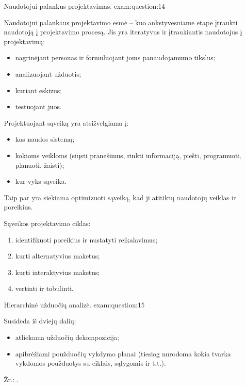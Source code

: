 \begin{question}{%
  Naudotojui palankus projektavimas.
  }{exam:question:14}
  
  Naudotojui palankaus projektavimo esmė – kuo ankstyvesniame etape
  įtraukti naudotoją į projektavimo procesą.\cite[165p.]{konspektas}
  Jis yra iteratyvus ir įtraukiantis naudotojus į projektavimą:
  \begin{itemize}
    \item nagrinėjant personas ir formuluojant joms panaudojamumo
      tikslus;
    \item analizuojant užduotis;
    \item kuriant eskizus;
    \item testuojant juos.
  \end{itemize}

  Projektuojant sąveiką yra atsižvelgiama į\cite[6]{skaidres-6}:
  \begin{itemize}
    \item kas naudos sistemą;
    \item kokioms veikloms (siųsti pranešimus, rinkti informaciją,
      piešti, programuoti, planuoti, žaisti);
    \item kur vyks sąveika.
  \end{itemize}
  Taip par yra siekiama optimizuoti sąveiką, kad ji atitiktų naudotojų
  veiklas ir poreikius.

  Sąveikos projektavimo ciklas\cite[10]{skaidres-6}:
  \begin{enumerate}
    \item identifikuoti poreikius ir nustatyti reikalavimus;
    \item kurti alternatyvius maketus;
    \item kurti interaktyvius maketus;
    \item vertinti ir tobulinti.
  \end{enumerate}

\end{question}

\begin{question}{%
  Hierarchinė užduočių analizė.
  }{exam:question:15}

  Susideda iš dviejų dalių:
  \begin{itemize}
    \item atliekama užduočių dekompozicija;
    \item apibrėžiami použduočių vykdymo planai (tiesiog nurodoma kokia
      tvarka vykdomos použduotys su ciklais, sąlygomis ir t.t.).
  \end{itemize}

  Žr.: \cite[40--43]{skaidres-6}.
\end{question}

